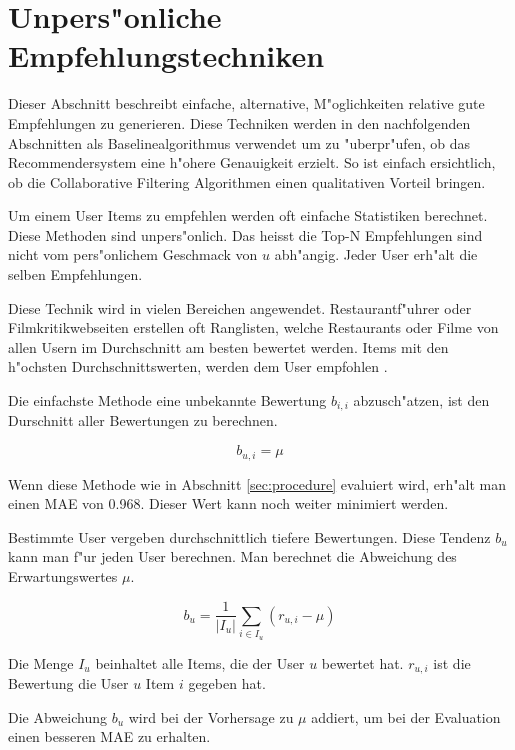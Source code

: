 \documentclass[a4paper, 12pt]{article}
\begin{document}
\section{Unpers"onliche Empfehlungstechniken}
\label{sec:simple}

Dieser Abschnitt beschreibt einfache, alternative, M"oglichkeiten relative gute Empfehlungen zu generieren. Diese Techniken werden in den nachfolgenden Abschnitten als Baselinealgorithmus verwendet um zu "uberpr"ufen, ob das Recommendersystem eine h"ohere Genauigkeit erzielt. So ist einfach ersichtlich, ob die Collaborative Filtering Algorithmen einen qualitativen Vorteil bringen.

Um einem User Items zu empfehlen werden oft einfache Statistiken berechnet. Diese Methoden sind unpers"onlich. Das heisst die Top-N Empfehlungen sind nicht vom pers"onlichem Geschmack von $u$ abh"angig. Jeder User erh"alt die selben Empfehlungen. 

Diese Technik wird in vielen Bereichen angewendet. Restaurantf"uhrer oder Filmkritikwebseiten erstellen oft Ranglisten, welche Restaurants oder Filme von allen Usern im Durchschnitt am besten bewertet werden. Items mit den h"ochsten Durchschnittswerten, werden dem User empfohlen \cite{jannach11}.

Die einfachste Methode eine unbekannte Bewertung $b_{i,i}$ abzusch"atzen, ist den Durschnitt aller Bewertungen zu berechnen.

\begin{equation}
  \label{eq:avg}
  b_{u,i} = \mu
\end{equation}

Wenn diese Methode wie in Abschnitt \ref{sec:procedure} evaluiert wird, erh"alt man einen MAE von 0.968. Dieser Wert kann noch weiter minimiert werden.

Bestimmte User vergeben durchschnittlich tiefere Bewertungen. Diese Tendenz $b_u$ kann man f"ur jeden User berechnen. Man berechnet die Abweichung des Erwartungswertes $\mu$.

\begin{equation}
  b_u = \frac{1}{|I_u|}\sum_{i \in I_u}(r_{u,i} - \mu)
\end{equation}

Die Menge $I_u$ beinhaltet alle Items, die der User $u$ bewertet hat. $r_{u,i}$ ist die Bewertung die User $u$ Item $i$ gegeben hat.

Die Abweichung $b_u$ wird bei der Vorhersage zu $\mu$ addiert, um bei der Evaluation einen besseren MAE zu erhalten.
\end{document}
